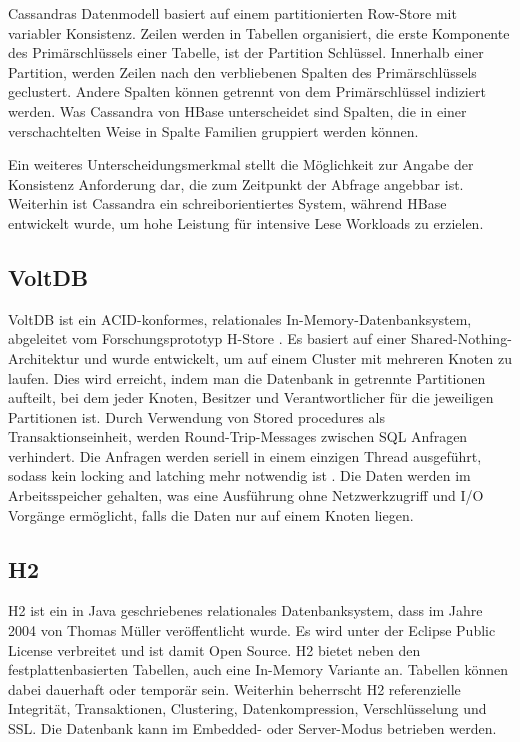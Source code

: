 Cassandras Datenmodell basiert auf einem partitionierten Row-Store mit variabler Konsistenz. Zeilen werden in Tabellen organisiert, die erste Komponente des Primärschlüssels einer Tabelle, ist der Partition Schlüssel. Innerhalb einer Partition, werden Zeilen nach den verbliebenen Spalten des Primärschlüssels geclustert. Andere Spalten können getrennt von dem Primärschlüssel indiziert werden. Was Cassandra von HBase unterscheidet sind Spalten, die in einer verschachtelten Weise in Spalte Familien gruppiert werden können.

Ein weiteres Unterscheidungsmerkmal stellt die Möglichkeit zur Angabe der Konsistenz Anforderung dar, die zum Zeitpunkt der Abfrage angebbar ist. Weiterhin ist Cassandra ein schreiborientiertes System, während HBase entwickelt wurde, um hohe Leistung für intensive Lese Workloads zu erzielen.

\subsection{VoltDB} 
\label{ch:AnalyseDatenbanken:sec:Datenbanken:subsec:VoltDB}

VoltDB \cite{volt2013a} ist ein ACID-konformes, relationales In-Memory-Datenbanksystem, abgeleitet vom Forschungsprototyp H-Store \cite{kallman08}. Es basiert auf einer Shared-Nothing-Architektur und wurde entwickelt, um auf einem Cluster mit mehreren Knoten zu laufen. Dies wird erreicht, indem man die Datenbank in getrennte Partitionen aufteilt, bei dem jeder Knoten, Besitzer und Verantwortlicher für die jeweiligen Partitionen ist. Durch Verwendung von Stored procedures als Transaktionseinheit, werden Round-Trip-Messages zwischen SQL Anfragen verhindert. Die Anfragen werden seriell in einem einzigen Thread ausgeführt, sodass kein locking and latching mehr notwendig ist \cite{volt2013b}. Die Daten werden im Arbeitsspeicher gehalten, was eine Ausführung ohne Netzwerkzugriff und I/O Vorgänge ermöglicht, falls die Daten nur auf einem Knoten liegen.  

\subsection{H2} 
\label{ch:AnalyseDatenbanken:sec:Datenbanken:subsec:H2}

H2 ist ein in Java geschriebenes relationales Datenbanksystem, dass im Jahre 2004 von Thomas Müller veröffentlicht wurde. Es wird unter der Eclipse Public License verbreitet und ist damit Open Source. H2 bietet neben den festplattenbasierten Tabellen, auch eine In-Memory Variante an. Tabellen können dabei dauerhaft oder temporär sein. Weiterhin beherrscht H2 referenzielle Integrität, Transaktionen, Clustering, Datenkompression, Verschlüsselung und SSL. Die Datenbank kann im Embedded- oder Server-Modus betrieben werden.

